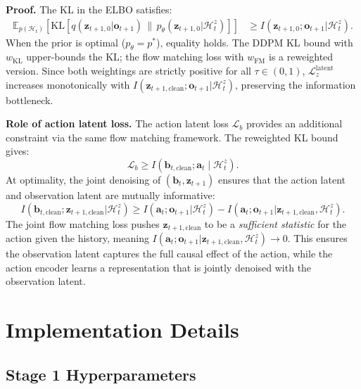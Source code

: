 \documentclass{article}
\newcommand{\vo}{\bm{o}}
\newcommand{\vz}{\bm{z}}
\newcommand{\va}{\bm{a}}
\newcommand{\vb}{\bm{b}}
\newcommand{\E}{\mathbb{E}}
\newcommand{\KL}{\mathrm{KL}}
\newcommand{\loss}{\mathcal{L}}
\begin{document}
\textbf{Proof.}
The KL in the ELBO satisfies:
\begin{align}
  \E_{p(\mathcal{H}_t)}\!\left[\KL\!\left[q(\vz_{t+1,0} | \vo_{t+1}) \,\|\, p_\theta(\vz_{t+1,0} | \mathcal{H}_t^z)\right]\right]
  &\geq I(\vz_{t+1,0}; \vo_{t+1} | \mathcal{H}_t^z).
\end{align}
When the prior is optimal ($p_\theta = p^*$), equality holds. The DDPM KL bound with $w_{\KL}$ upper-bounds the KL; the flow matching loss with $w_{\text{FM}}$ is a reweighted version. Since both weightings are strictly positive for all $\tau \in (0,1)$, $\loss_z^{\text{latent}}$ increases monotonically with $I(\vz_{t+1,\text{clean}}; \vo_{t+1} | \mathcal{H}_t^z)$, preserving the information bottleneck.

\textbf{Role of action latent loss.}
The action latent loss $\loss_b$ provides an additional constraint via the same flow matching framework. The reweighted KL bound gives:
\begin{equation}
  \loss_b \geq I(\vb_{t,\text{clean}}; \va_t \mid \mathcal{H}_t^z).
\end{equation}
At optimality, the joint denoising of $(\vb_t, \vz_{t+1})$ ensures that the action latent and observation latent are mutually informative:
\begin{equation}
  I(\vb_{t,\text{clean}}; \vz_{t+1,\text{clean}} | \mathcal{H}_t^z) \geq I(\va_t; \vo_{t+1} | \mathcal{H}_t^z) - I(\va_t; \vo_{t+1} | \vz_{t+1,\text{clean}}, \mathcal{H}_t^z).
\end{equation}
The joint flow matching loss pushes $\vz_{t+1,\text{clean}}$ to be a \emph{sufficient statistic} for the action given the history, meaning $I(\va_t; \vo_{t+1} | \vz_{t+1,\text{clean}}, \mathcal{H}_t^z) \to 0$. This ensures the observation latent captures the full causal effect of the action, while the action encoder learns a representation that is jointly denoised with the observation latent.

\section{Implementation Details}
\label{app:implementation}

\subsection{Stage 1 Hyperparameters}
\end{document}

